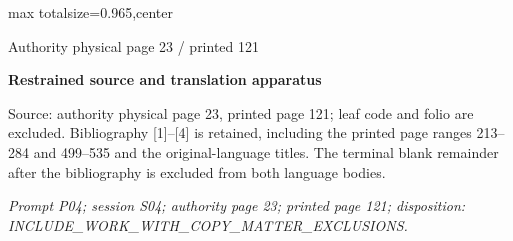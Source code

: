 \documentclass{article}
\begin{document}
\newpage
\noindent\begin{adjustbox}{max totalsize={\textwidth}{0.965\textheight},center}\begin{minipage}{\textwidth}
\noindent\hfill\scriptsize Authority physical page 23 / printed 121\par\normalsize
\textbf{Restrained source and translation apparatus}\par
Source: authority physical page 23, printed page 121; leaf code and folio are excluded. Bibliography [1]–[4] is retained, including the printed page ranges 213–284 and 499–535 and the original-language titles. The terminal blank remainder after the bibliography is excluded from both language bodies.
\par\smallskip
\textit{Prompt P04; session S04; authority page 23; printed page 121; disposition: INCLUDE\_WORK\_WITH\_COPY\_MATTER\_EXCLUSIONS.}
\end{minipage}\end{adjustbox}
\end{document}
